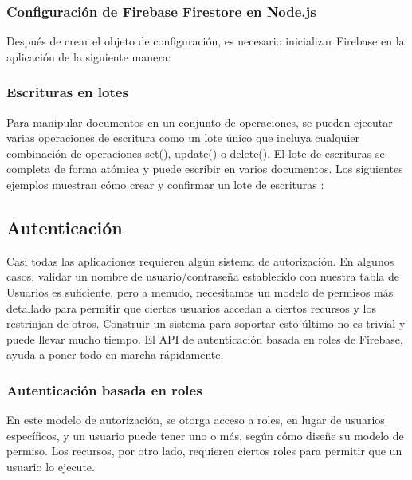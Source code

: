\newpage
\subsubsection{Configuración de Firebase Firestore en Node.js}
Después de crear el objeto de configuración, es necesario inicializar Firebase en la aplicación de la siguiente manera:
\vspace{0.8cm}



\subsubsection{Escrituras en lotes}
Para manipular documentos en un conjunto de operaciones, se pueden ejecutar varias operaciones de escritura como un lote único que incluya cualquier combinación de operaciones set(), update() o delete(). El lote de escrituras se completa de forma atómica y puede escribir en varios documentos. Los siguientes ejemplos muestran cómo crear y confirmar un lote de escrituras \cite{transactions}:
\vspace{0.8cm}




\subsection{Autenticación}
Casi todas las aplicaciones requieren algún sistema de autorización. En algunos casos, validar un nombre de usuario/contraseña establecido con nuestra tabla de Usuarios es suficiente, pero a menudo, necesitamos un modelo de permisos más detallado para permitir que ciertos usuarios accedan a ciertos recursos y los restrinjan de otros. Construir un sistema para soportar esto último no es trivial y puede llevar mucho tiempo. El API de autenticación basada en roles de Firebase, ayuda a poner todo en marcha rápidamente.

\subsubsection{Autenticación basada en roles}
En este modelo de autorización, se otorga acceso a roles, en lugar de usuarios específicos, y un usuario puede tener uno o más, según cómo diseñe su modelo de permiso. Los recursos, por otro lado, requieren ciertos roles para permitir que un usuario lo ejecute.
\vspace{0.8cm}

